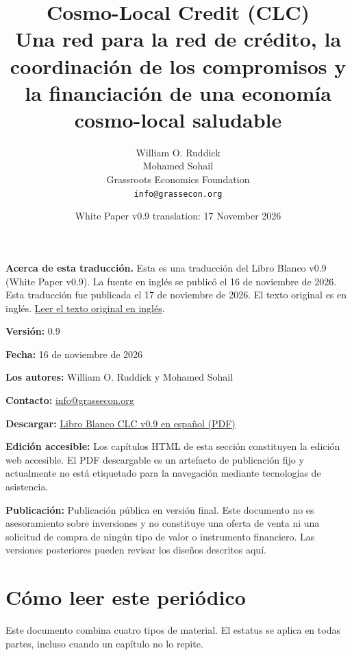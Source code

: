 \documentclass[11pt]{article}
\title{Cosmo-Local Credit (CLC)\\Una red para la red de crédito, la coordinación de los compromisos y la financiación de una economía cosmo-local saludable}
\author{William O. Ruddick \\ Mohamed Sohail \\ Grassroots Economics Foundation \\ \texttt{info@grassecon.org}}
\date{White Paper v0.9 translation: 17 November 2026}
\begin{document}
\maketitle
\tableofcontents
\newpage
\sloppy
\RaggedRight

\textbf{Acerca de esta traducción.} Esta es una traducción del Libro Blanco v0.9 (White Paper v0.9). La fuente en inglés se publicó el 16 de noviembre de 2026. Esta traducción fue publicada el 17 de noviembre de 2026. El texto original es en inglés. \href{https://docs.cosmolocal.credit/white-paper}{Leer el texto original en inglés}.

\textbf{Versión:} 0.9

\textbf{Fecha:} 16 de noviembre de 2026

\textbf{Los autores:} William O. Ruddick y Mohamed Sohail

\textbf{Contacto:} \href{mailto:info@grassecon.org}{info@grassecon.org}

\textbf{Descargar:} \href{https://docs.cosmolocal.credit/white-paper/Cosmo-Local-Credit-CLC-White-Paper-v9-es.pdf}{Libro Blanco CLC v0.9 en español (PDF)}

\textbf{Edición accesible:} Los capítulos HTML de esta sección constituyen la edición web accesible. El PDF descargable es un artefacto de publicación fijo y actualmente no está etiquetado para la navegación mediante tecnologías de asistencia.

\textbf{Publicación:} Publicación pública en versión final. Este documento no es asesoramiento sobre inversiones y no constituye una oferta de venta ni una solicitud de compra de ningún tipo de valor o instrumento financiero. Las versiones posteriores pueden revisar los diseños descritos aquí.

\section*{Cómo leer este periódico}

Este documento combina cuatro tipos de material. El estatus se aplica en todas partes, incluso cuando un capítulo no lo repite.
\end{document}
